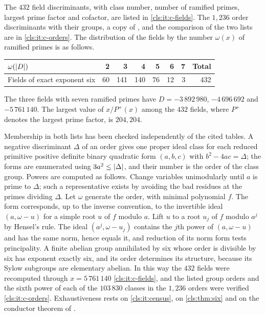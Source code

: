The $432$ field discriminants, with class number, number of ramified primes, largest prime
factor and cofactor, are listed in \ref{cls:it:c-fields}. The $1{,}236$ order discriminants
with their groups, a copy of \cite{Ross2026Data}, and the comparison of the two lists are
in \ref{cls:it:c-orders}. The distribution of the fields by the number $\omega(x)$ of
ramified primes is as follows.
\begin{center}
\begin{tabular}{lrrrrrrr}\toprule
$\omega(\lvert D\rvert)$ & 2&3&4&5&6&7&Total\\\midrule
Fields of exact exponent six&60&141&140&76&12&3&432\\\bottomrule
\end{tabular}
\end{center}
The three fields with seven ramified primes have $D=-3\,892\,980$, $-4\,696\,692$ and
$-5\,761\,140$. The largest value of $x/P^+(x)$ among the $432$ fields, where $P^+$
denotes the largest prime factor, is $204{,}204$.

\begin{remark}\label{cls:rem:forms}
Membership in both lists has been checked independently of the cited tables. A negative
discriminant $\Delta$ of an order gives one proper ideal class for each reduced primitive
positive definite binary quadratic form $(a,b,c)$ with $b^2-4ac=\Delta$; the forms are
enumerated using $3a^2\le\lvert\Delta\rvert$, and their number is the order of the class group.
Powers are computed as follows. Change variables unimodularly until $a$ is prime to
$\Delta$; such a representative exists by avoiding the bad residues at the primes dividing
$\Delta$. Let $\omega$ generate the order, with minimal polynomial $f$. The form
corresponds, up to the inverse convention, to the invertible ideal $(a,\omega-u)$ for a
simple root $u$ of $f$ modulo $a$. Lift $u$ to a root $u_j$ of $f$ modulo $a^j$ by
Hensel's rule. The ideal $(a^j,\omega-u_j)$ contains the $j$th power of $(a,\omega-u)$ and
has the same norm, hence equals it, and reduction of its norm form tests principality. A
finite abelian group annihilated by six whose order is divisible by six has exponent
exactly six, and its order determines its structure, because its Sylow subgroups are
elementary abelian. In this way the $432$ fields were recomputed through $x=5\,761\,140$
\ref{cls:it:c-fields}, and the listed group orders and the sixth power of each of the
$103\,830$ classes in the $1{,}236$ orders were verified \ref{cls:it:c-orders}.
Exhaustiveness rests on \ref{cls:it:census}, on \cref{cls:thm:six} and on the conductor
theorem of \cite{Aiken2026Boundary}.
\end{remark}

